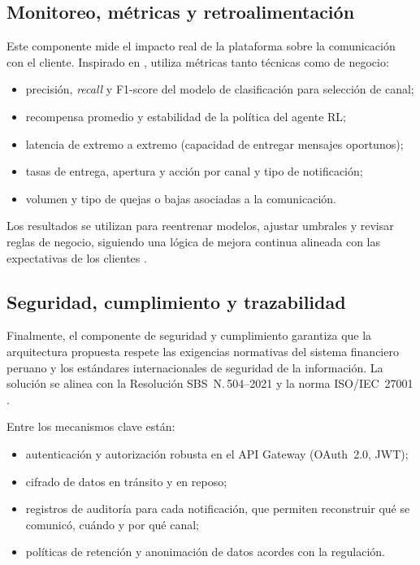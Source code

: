 \documentclass[conference]{IEEEtran}
\begin{document}
\subsection{Monitoreo, m{\'e}tricas y retroalimentaci{\'o}n}

Este componente mide el impacto real de la plataforma sobre la comunicaci{\'o}n con el cliente. Inspirado en \cite{rahimi2021,yancey2020}, utiliza m{\'e}tricas tanto t{\'e}cnicas como de negocio:

\begin{itemize}
  \item precisi{\'o}n, \textit{recall} y F1-score del modelo de clasificaci{\'o}n para selecci{\'o}n de canal;
  \item recompensa promedio y estabilidad de la pol{\'i}tica del agente RL;
  \item latencia de extremo a extremo (capacidad de entregar mensajes oportunos);
  \item tasas de entrega, apertura y acci{\'o}n por canal y tipo de notificaci{\'o}n;
  \item volumen y tipo de quejas o bajas asociadas a la comunicaci{\'o}n.
\end{itemize}

Los resultados se utilizan para reentrenar modelos, ajustar umbrales y revisar reglas de negocio, siguiendo una l{\'o}gica de mejora continua alineada con las expectativas de los clientes \cite{twilio2023}.

\subsection{Seguridad, cumplimiento y trazabilidad}

Finalmente, el componente de seguridad y cumplimiento garantiza que la arquitectura propuesta respete las exigencias normativas del sistema financiero peruano y los est{\'a}ndares internacionales de seguridad de la informaci{\'o}n. La soluci{\'o}n se alinea con la Resoluci{\'o}n SBS~N.\,504--2021 y la norma ISO/IEC~27001 \cite{sbs5042021,iso27001}.

Entre los mecanismos clave est{\'a}n:
\begin{itemize}
  \item autenticaci{\'o}n y autorizaci{\'o}n robusta en el API Gateway (OAuth~2.0, JWT);
  \item cifrado de datos en tr{\'a}nsito y en reposo;
  \item registros de auditor{\'i}a para cada notificaci{\'o}n, que permiten reconstruir qu{\'e} se comunic{\'o}, cu{\'a}ndo y por qu{\'e} canal;
  \item pol{\'i}ticas de retenci{\'o}n y anonimaci{\'o}n de datos acordes con la regulaci{\'o}n.
\end{itemize}
\end{document}
